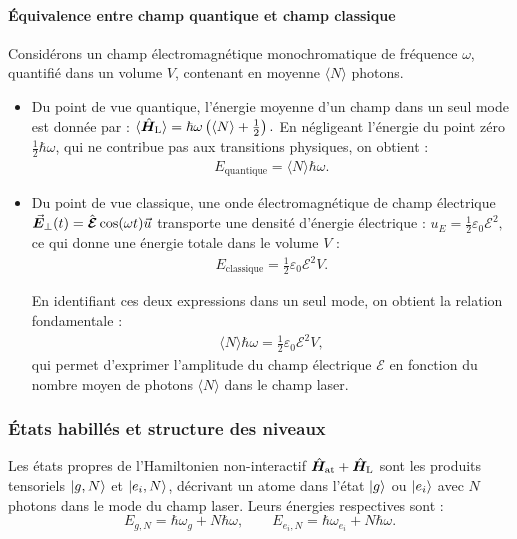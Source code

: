 \paragraph{Équivalence entre champ quantique et champ classique}

Considérons un champ électromagnétique monochromatique de fréquence \( \omega \), quantifié dans un volume \( V \), contenant en moyenne \( \langle N \rangle \) photons.

\begin{itemize}[label = $\bullet$]
  \item Du point de vue quantique, l’énergie moyenne d’un champ dans un seul mode est donnée par :
  \(
  \langle \hat{\bm{H}}_{\mathrm{L}} \rangle = \hbar \omega \left( \langle N \rangle + \frac{1}{2} \right).
  \)
  En négligeant l’énergie du point zéro \( \frac{1}{2} \hbar \omega \), qui ne contribue pas aux transitions physiques, on obtient :
  \begin{eqnarray}
  E_{\mathrm{quantique}} = \langle N \rangle \hbar \omega.
  \end{eqnarray}

  \item Du point de vue classique, une onde électromagnétique de champ électrique \( \vec{{\bm{E}}}_\perp(t) = \hat{\bm{\mathcal{E}}} \cos(\omega t) \vec{u} \) transporte une densité d’énergie électrique :
  \(
  u_E = \frac{1}{2} \varepsilon_0\mathcal{E}^2,
  \)
  ce qui donne une énergie totale dans le volume \( V \) :
  \begin{eqnarray}
  E_{\mathrm{classique}} = \frac{1}{2} \varepsilon_0 \mathcal{E}^2 V.
  \end{eqnarray}
  

	En identifiant ces deux expressions dans un seul mode, on obtient la relation fondamentale :
	\begin{eqnarray}
		\langle N \rangle \hbar \omega = \frac{1}{2} \varepsilon_0 \mathcal{E}^2 V,
	\end{eqnarray}
	qui permet d’exprimer l’amplitude du champ électrique \( \mathcal{E} \) en fonction du nombre moyen de photons \( \langle N \rangle \) dans le champ laser.
\end{itemize}

\medskip


\subsubsection{États habillés et structure des niveaux}

Les états propres de l’Hamiltonien non-interactif 
\( \hat{\bm{H}}_{\mathrm{at}} + \hat{\bm{H}}_{\mathrm{L}} \) 
sont les produits tensoriels \( \ket{g, N} \) et \( \ket{e_i, N} \), décrivant un atome dans l’état 
\( \ket{g} \) ou \( \ket{e_i} \) avec \( N \) photons dans le mode du champ laser. 
Leurs énergies respectives sont :
\[
E_{g,N} = \hbar \omega_{g} + N \hbar \omega, 
\qquad 
E_{e_i,N} = \hbar \omega_{e_i}  + N \hbar \omega.
\]

